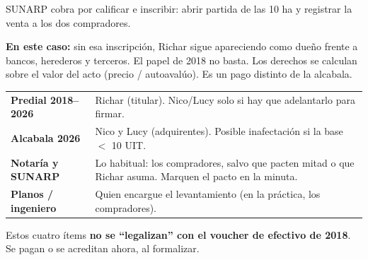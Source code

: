 \documentclass[12pt,a4paper]{article}
\begin{document}
SUNARP cobra por calificar e inscribir: abrir partida de las 10 ha y registrar la venta a los dos compradores.

\textbf{En este caso:} sin esa inscripción, Richar sigue apareciendo como dueño frente a bancos, herederos y terceros. El papel de 2018 no basta. Los derechos se calculan sobre el valor del acto (precio / autoavalúo). Es un pago distinto de la alcabala.

{\small\renewcommand{\arraystretch}{1.25}
\noindent\begin{tabularx}{\textwidth}{>{\bfseries}p{4.2cm} X}
Predial 2018--2026 & Richar (titular). Nico/Lucy solo si hay que adelantarlo para firmar. \\
Alcabala 2026 & Nico y Lucy (adquirentes). Posible inafectación si la base $<$ 10 UIT. \\
Notaría y SUNARP & Lo habitual: los compradores, salvo que pacten mitad o que Richar asuma. Marquen el pacto en la minuta. \\
Planos / ingeniero & Quien encargue el levantamiento (en la práctica, los compradores). \\
\end{tabularx}}

\vspace{0.35em}
\noindent Estos cuatro ítems \textbf{no se ``legalizan'' con el voucher de efectivo de 2018}. Se pagan o se acreditan ahora, al formalizar.

\LugarFecha
\FirmasCompradores
\vspace{0.4em}
\noindent
{}
\end{document}

